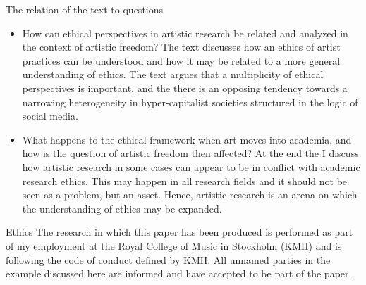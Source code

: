 \documentclass[presentation]{beamer}
\begin{document}
\begin{frame}[label={sec:org8ee5925}]{The relation of the text to questions}
\begin{itemize}
\item How can ethical perspectives in artistic research be related and analyzed in the context of artistic freedom?
The text discusses how an ethics of artist practices can be understood and how it may be related to a more general understanding of ethics. The text argues that a multiplicity of ethical perspectives is important, and the there is an opposing tendency towards a narrowing heterogeneity in hyper-capitalist societies structured in the logic of social media.
\item What happens to the ethical framework when art moves into academia, and how is the question of artistic freedom then affected?
At the end the I discuss how artistic research in some cases can appear to be in conflict with academic research ethics. This may happen in all research fields and it should not be seen as a problem, but an asset. Hence, artistic research is an arena on which the understanding of ethics may be expanded.
\end{itemize}
\end{frame}
\begin{frame}[label={sec:orgab1e0fc}]{Ethics}
The research in which this paper has been produced is performed as part of my employment at the Royal College of Music in Stockholm (KMH) and is following the code of conduct defined by KMH. All unnamed parties in the example discussed here are informed and have accepted to be part of the paper.
\end{frame}
\end{document}
